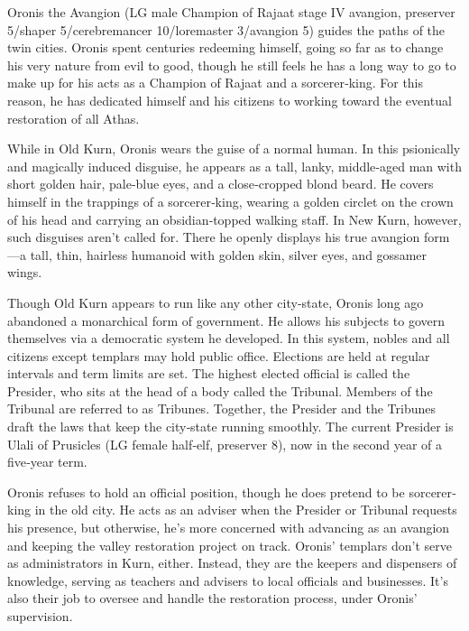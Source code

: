 {
	Oronis the Avangion (LG male Champion of Rajaat stage IV avangion, preserver 5/shaper 5/cerebremancer 10/loremaster 3/avangion 5) guides the paths of the twin cities. Oronis spent centuries redeeming himself, going so far as to change his very nature from evil to good, though he still feels he has a long way to go to make up for his acts as a Champion of Rajaat and a sorcerer‐king. For this reason, he has dedicated himself and his citizens to working toward the eventual restoration of all Athas.

	While in Old Kurn, Oronis wears the guise of a normal human. In this psionically and magically induced disguise, he appears as a tall, lanky, middle‐aged man with short golden hair, pale‐blue eyes, and a close‐cropped blond beard. He covers himself in the trappings of a sorcerer‐king, wearing a golden circlet on the crown of his head and carrying an obsidian‐topped walking staff. In New Kurn, however, such disguises aren’t called for. There he openly displays his true avangion form---a tall, thin, hairless humanoid with golden skin, silver eyes, and gossamer wings.

	Though Old Kurn appears to run like any other city-state, Oronis long ago abandoned a monarchical form of government. He allows his subjects to govern themselves via a democratic system he developed. In this system, nobles and all citizens except templars may hold public office. Elections are held at regular intervals and term limits are set. The highest elected official is called the Presider, who sits at the head of a body called the Tribunal. Members of the Tribunal are referred to as Tribunes. Together, the Presider and the Tribunes draft the laws that keep the city‐state running smoothly. The current Presider is Ulali of Prusicles (LG female half‐elf, preserver 8), now in the second year of a five‐year term.

	Oronis refuses to hold an official position, though he does pretend to be sorcerer‐king in the old city. He acts as an adviser when the Presider or Tribunal requests his presence, but otherwise, he’s more concerned with advancing as an avangion and keeping the valley restoration project on track. Oronis’ templars don’t serve as administrators in Kurn, either. Instead, they are the keepers and dispensers of knowledge, serving as teachers and advisers to local officials and businesses. It’s also their job to oversee and handle the restoration process, under Oronis’ supervision.
}
